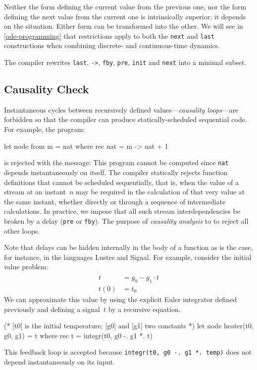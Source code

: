 \documentclass[11pt,titlepage,twoside]{report}
\makeatletter
\newcommand{\zls}[1]{{\@span{class="zelusinline"}#1}}
\newcommand{\zls}[1]{\texttt{#1}}
\renewcommand{\zls}[1]{\texttt{#1}}
\newcommand{\lustre}{{\sf Lustre}}
\newcommand{\signal}{{\sf Signal}}
\newcommand{\Remark}{\medskip\noindent{\bf Remark: }}
\makeatother
\begin{document}
Neither the form defining the current value from the previous one, nor the 
form defining the next value from the current one is intrinsically superior; 
it depends on the situation.
Either form can be transformed into the other.
We will see in \cref{ode-programming} that restrictions apply to both the 
\zls{next} and \zls{last} constructions when combining discrete- and
continuous-time dynamics.

\Remark The compiler rewrites \zls{last}, \zls{->}, \zls{fby}, \zls{pre}, 
\zls{init} and \zls{next} into a minimal subset.

\subsection{Causality Check\label{causalcheck}} %

Instantaneous cycles between recursively defined values---\emph{causality 
loops}---are forbidden so that the compiler can produce statically-scheduled 
sequential code.
For example, the program:%
\begin{chklisting}[fail]
let node from m = nat where
  rec nat = m -> nat + 1
\end{chklisting}
is rejected with the message:
\chklistingerr{}
\noindent
This program cannot be computed since \zls{nat} depends instantaneously on 
itself.
The compiler statically rejects function definitions that cannot be 
scheduled sequentially, that is, when the value of a stream at an 
instant~$n$ may be required in the calculation of that very value at the 
same instant, whether directly or through a sequence of intermediate 
calculations.
In practice, we impose that all such stream interdependencies be broken by a 
delay (\zls{pre} or \zls{fby}).
The purpose of \emph{causality analysis} to to reject all other loops.

Note that delays can be hidden internally in the body of a function as
is the case, for instance, in the languages \lustre{} and \signal.
For example, consider the initial value problem:
\begin{align*}
\dot{t} &= g_0 - g_1 \cdot t \\
t(0) &= t_0
\end{align*}
We can approximate this value by using the explicit Euler integrator defined 
previously and defining a signal~$t$ by a recursive equation.
\begin{chklisting}[withresult,include=integr]
(* [t0] is the initial temperature; [g0] and [g1] two constants *)
let node heater(t0, g0, g1) = t where
  rec t = integr(t0, g0 -. g1 *. t)
\end{chklisting}
This feedback loop is accepted because \zls{integr(t0, g0 -. g1 *. temp)} 
does not depend instantaneously on its input.
\end{document}
